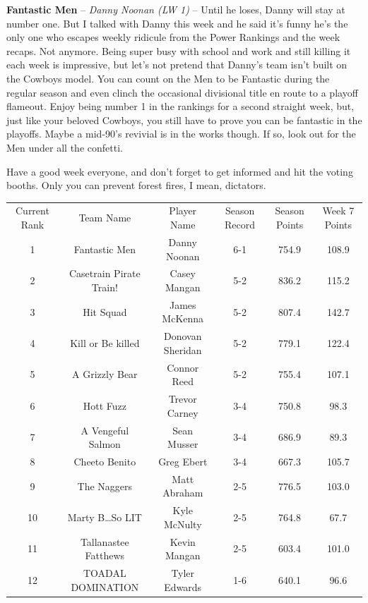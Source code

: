 \documentclass[11pt,letterpaper]{article}
\begin{document}
\begin{etaremune}
\item \textbf{Fantastic Men} -- \textit{Danny Noonan (LW 1)} -- Until he loses, Danny will stay at number one. But I talked with Danny this week and he said it's funny he's the only one who escapes weekly ridicule from the Power Rankings and the week recaps. Not anymore. Being super busy with school and work and still killing it each week is impressive, but let's not pretend that Danny's team isn't built on the Cowboys model. You can count on the Men to be Fantastic during the regular season and even clinch the occasional divisional title en route to a playoff flameout. Enjoy being number 1 in the rankings for a second straight week, but, just like your beloved Cowboys, you still have to prove you can be fantastic in the playoffs. Maybe a mid-90's revivial is in the works though. If so, look out for the Men under all the confetti.
\end{etaremune}
Have a good week everyone, and don't forget to get informed and hit the voting booths. Only you can prevent forest fires, I mean, dictators. 


\newpage
{}
\vspace{-25pt}
\begin{table} [h]
\footnotesize
\begin{center}
\begin{tabular} { c c c c c c }
\\[3mm] Current Rank & Team Name & Player Name & Season Record &  Season Points & Week 7 Points
\\[3mm] 1 & Fantastic Men & Danny Noonan & 6-1 & 754.9 & 108.9
\\ 2 & Casetrain Pirate Train! & Casey Mangan & 5-2 & 836.2 & 115.2
\\ 3 & Hit Squad & James McKenna & 5-2 & 807.4 & 142.7
\\ 4 & Kill or Be killed & Donovan Sheridan & 5-2 & 779.1 & 122.4
\\ 5 & A Grizzly Bear & Connor Reed & 5-2 & 755.4 & 107.1
\\ 6 & Hott Fuzz & Trevor Carney & 3-4 & 750.8 & 98.3
\\ 7 & A Vengeful Salmon & Sean Musser & 3-4 & 686.9 & 89.3
\\ 8 & Cheeto Benito & Greg Ebert & 3-4 & 667.3 & 105.7
\\ 9 & The Naggers & Matt Abraham & 2-5 & 776.5 & 103.0
\\ 10 & Marty B\dots So LIT & Kyle McNulty & 2-5 & 764.8 & 67.7
\\ 11 & Tallanastee Fatthews & Kevin Mangan & 2-5 & 603.4 & 101.0
\\ 12 & TOADAL DOMINATION & Tyler Edwards & 1-6 & 640.1 & 96.6
\end{tabular}
\end{center}
\end{table}
\end{document}

